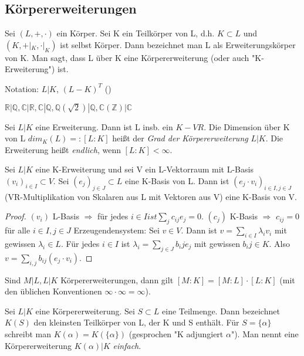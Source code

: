 \documentclass[../main.tex]{subfiles}
\begin{document}
\subsection{Körpererweiterungen}
\begin{definition}[Körpererweiterung]
    Sei $(L, +, \cdot)$ ein Körper. Sei K ein Teilkörper von L, d.h. $K \subset L$ und $(K,+|_K,\cdot|_K)$ ist selbst Körper. Dann bezeichnet man L als Erweiterungskörper von K. Man sagt, dass L über K eine Körpererweiterung (oder auch "K-Erweiterung") ist. 

    Notation: $L | K$, $(L - K)^T$ ()
\end{definition}
\begin{example*} $\mathbb{R}|\mathbb{Q}, \mathbb{C}|\mathbb{R},\mathbb{C}|\mathbb{Q},\mathbb{Q}(\sqrt{2}) | \mathbb{Q}, \mathbb{C}(\mathbb{Z}) | \mathbb{C}$ \end{example*}
\begin{definition}
    Sei $L | K$ eine Erweiterung. Dann ist L insb. ein $K-VR$. Die Dimension über K von L $dim_K(L) =: [L:K]$ heißt der \emph{Grad der Körpererweiterung} $L | K$. Die Erweiterung heißt \emph{endlich}, wenn $[L:K] < \infty$.
\end{definition}
\begin{lemma}
    Sei $L | K$ eine K-Erweiterung und sei V ein L-Vektorraum mit L-Basis $(v_i)_{i \in I} \subset V$. Sei $(e_j)_{j \in J} \subset L$ eine K-Basis von L. Dann ist $(e_j \cdot v_i)_{i \in I, j \in J}$ (VR-Multiplikation von Skalaren aus L mit Vektoren aus V) eine K-Basis von V.
\end{lemma}
\begin{proof}
$(v_i)$ L-Basis $\Rightarrow$ für jedes $i \in I ist \sum_j c_{ij}e_j = 0$. $(c_j)$ K-Basis $\Rightarrow$ $c_{ij} = 0$ für alle $i \in I, j \in J$
Erzeugendensystem: Sei $v \in V$.
Dann ist $v = \sum_{i \in I} \lambda_iv_i$ mit gewissen $\lambda_i \in L$. Für jedes $i \in I$ ist $\lambda_i = \sum_{j \in J} b_ije_j$ mit gewissen $b_ij \in K$. Also $v = \sum_{i,j} b_{ij}(e_j \cdot v_i)$.
\end{proof}
\begin{lemma}[Korollar]
    Sind $M | L, L | K$ Körpererweiterungen, dann gilt $[M:K] = [M:L]\cdot[L:K]$ (mit den üblichen Konventionen $\infty \cdot \infty = \infty$).
\end{lemma}
\begin{definition}[Adjungieren]
    Sei $L | K$ eine Körpererweiterung. Sei $S \subset L$ eine Teilmenge. Dann bezeichnet $K(S)$ den kleinsten Teilkörper von L, der K und S enthält. Für $S=\{\alpha\}$ schreibt man $K(\alpha) = K(\{\alpha\})$ (gesprochen "K adjungiert $\alpha$"). Man nennt eine Körpererweiterung $K(\alpha) | K$ \emph{einfach}.
\end{definition}
\end{document}
